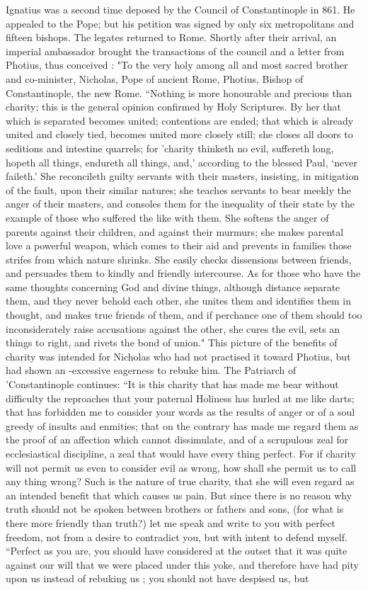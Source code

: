 Ignatius was a second time deposed by the Council of Constantinople in 861. He appealed to the Pope; but his petition was signed by only six metropolitans and fifteen bishops. The legates returned to Rome. Shortly after their arrival, an imperial ambassador brought the transactions of the council and a letter from Photius, thus conceived : "To the very holy among all and most sacred brother and co-minister, Nicholas, Pope of ancient Rome, Photius, Bishop of Constantinople, the new Rome. “Nothing is more honourable and precious than charity; this is the general opinion confirmed by Holy Scriptures. By her that which is separated becomes united; contentions are ended; that which is already united and closely tied, becomes united more closely still; she closes all doors to seditions and intestine quarrels; for 'charity thinketh no evil, suffereth long, hopeth all things, endureth all things, and,' according to the blessed Paul, ‘never faileth.' She reconcileth guilty servants with their masters, insisting, in mitigation of the fault, upon their similar natures; she teaches servants to bear meekly the anger of their masters, and consoles them for the inequality of their state by the example of those who suffered the like with them. She softens the anger of parents against their children, and against their murmurs; she makes parental love a powerful weapon, which comes to their aid and prevents in families those strifes from which nature shrinks. She easily checks dissensions between friends, and persuades them to kindly and friendly intercourse. As for those who have the same thoughts concerning God and divine things, although distance separate them, and they never behold each other, she unites them and identifies them in thought, and makes true friends of them, and if perchance one of them should too inconsiderately raise accusations against the other, she cures the evil, sets an things to right, and rivets the bond of union." This picture of the benefits of charity was intended for Nicholas who had not practised it toward Photius, but had shown an -excessive eagerness to rebuke him. The Patriarch of 'Constantinople continues: “It is this charity that has made me bear without difficulty the reproaches that your paternal Holiness has hurled at me like darts; that has forbidden me to consider your words as the results of anger or of a soul greedy of insults and enmities; that on the contrary has made me regard them as the proof of an affection which cannot dissimulate, and of a scrupulous zeal for ecclesiastical discipline, a zeal that would have every thing perfect. For if charity will not permit us even to consider evil as wrong, how shall she permit us to call any thing wrong? Such is the nature of true charity, that she will even regard as an intended benefit that which causes us pain. But since there is no reason why truth should not be spoken between brothers or fathers and sons, (for what is there more friendly than truth?) let me speak and write to you with perfect freedom, not from a desire to contradict you, but with intent to defend myself. “Perfect as you are, you should have considered at the outset that it was quite against our will that we were placed under this yoke, and therefore have had pity upon us instead of rebuking us ; you should not have despised us, but 